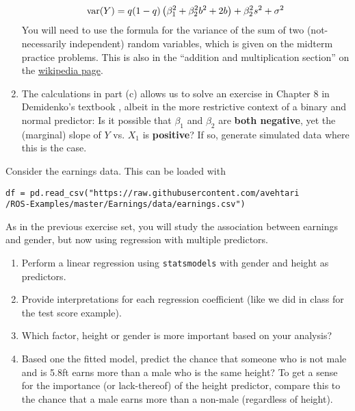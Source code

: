 \begin{exercise}
\begin{enumerate}[label=(\alph*)]
\begin{equation*}
{\rm var}(Y) = q(1-q)\left(\beta_1^2 + \beta_2^2b^2 + 2 b \right) + \beta_2^2s^2
+ \sigma^2
\end{equation*}
You will need to use the formula for the variance of the sum of two (not-necessarily independent) random variables, which is given on the midterm practice problems.  
This is also in the ``addition and multiplication section'' on the \href{https://en.wikipedia.org/wiki/Variance#Properties}{wikipedia  page}.
\item The calculations in part (c) allows us to solve an exercise in Chapter 8 in Demidenko's textbook \cite{demidenko2019advanced}, albeit in the more restrictive  context of a binary and normal predictor: 
Is it possible that $\beta_1$ and $\beta_2$ are {\bf both negative}, yet the (marginal) slope of $Y$ vs. $X_1$ is {\bf positive}? If so, generate simulated data where this is the case. 
\end{enumerate}
\end{exercise}





\begin{exercise} Consider the earnings data. This can be loaded with 
\begin{Verbatim}
df = pd.read_csv("https://raw.githubusercontent.com/avehtari
/ROS-Examples/master/Earnings/data/earnings.csv")
\end{Verbatim}
As in the previous exercise set, you will study the association between earnings and gender, but now using regression with multiple predictors. 

\begin{enumerate}[label=(\alph*)]
\item Perform a linear regression using \verb!statsmodels! with gender and height as predictors. 
\item Provide interpretations for each regression coefficient (like we did in class for the test score example). 
\item Which factor, height or gender is more important based on your analysis? 
\item Based one the fitted model, predict the chance that someone who is not male and is 5.8ft earns more than a male who is the same height? To get a sense for the importance (or lack-thereof) of the height predictor, compare this to the chance that a male earns more than a non-male (regardless of height).
\end{enumerate}
\end{exercise}

